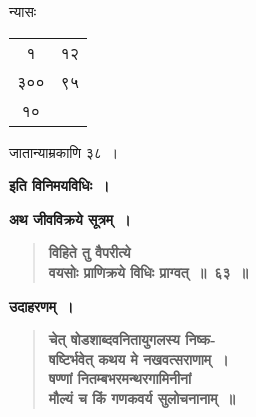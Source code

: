 \documentclass[11pt, openany]{book}
\begin{document}
न्यासः \begin{tabular}{c|c}
१ & १२ \\
३०० & ९५ \\
१० & 
\end{tabular} जातान्याम्रकाणि ३८~।\\

\begin{center}
\textbf{इति विनिमयविधिः~।}
\end{center}
\vspace{2mm}

{\large \textbf{अथ जीवविक्रये सूत्रम्~।}}

 \label{1.63}
\begin{quote}
{\large \textbf{{\color{purple}विहिते तु वैपरीत्ये \\
वयसोः प्राणिक्रये विधिः प्राग्वत्~॥~६३~॥}}}
\end{quote}

\noindent \textbf{उदाहरणम्~।}

 \label{Ex 1.81}
\begin{quote}
\textbf{{\color{red}चेत् षोडशाब्दवनितायुगलस्य निष्क-\\
षष्टिर्भवेत् कथय मे नखवत्सराणाम्~।\\
षण्णां नितम्बभरमन्थरगामिनीनां \\
मौल्यं च किं गणकवर्य सुलोचनानाम्~॥}}
\end{quote}

\newpage
\end{document}
